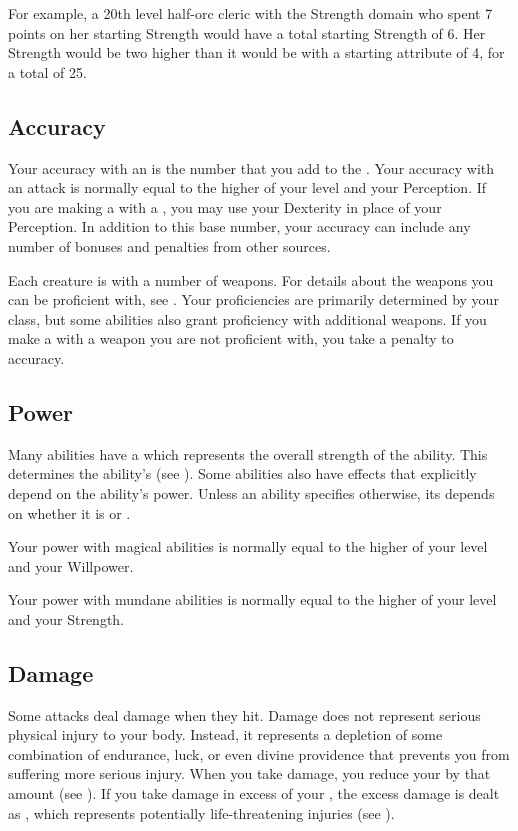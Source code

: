             For example, a 20th level half-orc cleric with the Strength domain who spent 7 points on her starting Strength would have a total starting Strength of 6.
            Her Strength would be two higher than it would be with a starting attribute of 4, for a total of 25.

    \subsection{Accuracy}\label{Accuracy}
        Your accuracy with an  is the number that you add to the .
        Your accuracy with an attack is normally equal to the higher of your level and your Perception.
        If you are making a  with a , you may use your Dexterity in place of your Perception.
        In addition to this base number, your accuracy can include any number of bonuses and penalties from other sources.

         Each creature is  with a number of weapons.
        For details about the weapons you can be proficient with, see .
        Your proficiencies are primarily determined by your class, but some abilities also grant proficiency with additional weapons.
        If you make a  with a weapon you are not proficient with, you take a  penalty to accuracy.

    \subsection{Power}\label{Power}
        Many abilities have a  which represents the overall strength of the ability.
        This determines the ability's  (see ).
        Some abilities also have effects that explicitly depend on the ability's power.
        Unless an ability specifies otherwise, its  depends on whether it is  or .

        Your power with magical abilities is normally equal to the higher of your level and your Willpower.

        Your power with mundane abilities is normally equal to the higher of your level and your Strength.

    \subsection{Damage}\label{Damage}
        Some attacks deal damage when they hit.
        Damage does not represent serious physical injury to your body.
        Instead, it represents a depletion of some combination of endurance, luck, or even divine providence that prevents you from suffering more serious injury.
        When you take damage, you reduce your  by that amount (see ).
        If you take damage in excess of your , the excess damage is dealt as , which represents potentially life-threatening injuries (see ).

